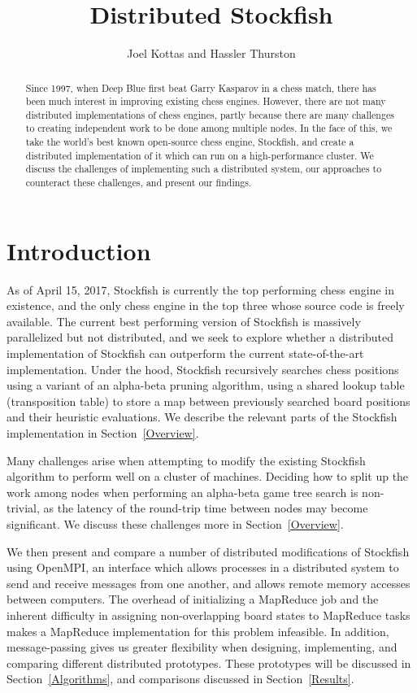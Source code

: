 \documentclass{article}
\title{Distributed Stockfish}
\author{Joel Kottas and Hassler Thurston}
\date{}
\begin{document}
\maketitle

\begin{abstract}
	Since 1997, when Deep Blue first beat Garry Kasparov in a chess match, there has been much
	interest in improving existing chess engines. However, there are not
	many distributed implementations of chess engines, partly
	because there are many challenges to creating independent work to be
	done among multiple nodes. In the face of this, we take the world's
	best known open-source chess engine, Stockfish, and create a distributed
	implementation of it which can run on a high-performance cluster. We
	discuss the challenges of implementing such a distributed system, our
	approaches to counteract these challenges, and present our findings.
\end{abstract}

\section{Introduction}
As of April 15, 2017, Stockfish\cite{Stockfish} is currently the top performing
chess engine in existence, and the only chess engine in the top three whose
source code is freely available\cite{ChessStandings}. The current best
performing version of Stockfish is massively parallelized but not distributed,
and we seek to explore whether a distributed implementation of Stockfish can
outperform the current state-of-the-art implementation. Under the hood,
Stockfish recursively searches chess positions using a variant of an alpha-beta
pruning algorithm, using a shared lookup table (transposition table) to
store a map between previously searched board positions and their heuristic
evaluations. We describe the relevant parts of the Stockfish implementation in
Section~\ref{Overview}.

Many challenges arise when attempting to modify the
existing Stockfish algorithm to perform well on a cluster of machines.
Deciding how to split up the work among nodes when performing an alpha-beta game
tree search is non-trivial, as the latency of the round-trip time between nodes
may become significant. We discuss these challenges more in
Section~\ref{Overview}.

We then present and compare a number of distributed modifications of Stockfish
using OpenMPI\cite{OpenMPI}, an interface which allows processes in a distributed system to
send and receive messages from one another, and allows remote memory accesses
between computers. The overhead of initializing a MapReduce job and the
inherent difficulty in assigning non-overlapping board states to MapReduce tasks
makes a MapReduce implementation for this problem infeasible. In addition,
message-passing gives us greater flexibility when designing, implementing, and
comparing different distributed prototypes. These prototypes will be discussed in
Section~\ref{Algorithms}, and comparisons discussed in Section~\ref{Results}.
\end{document}
